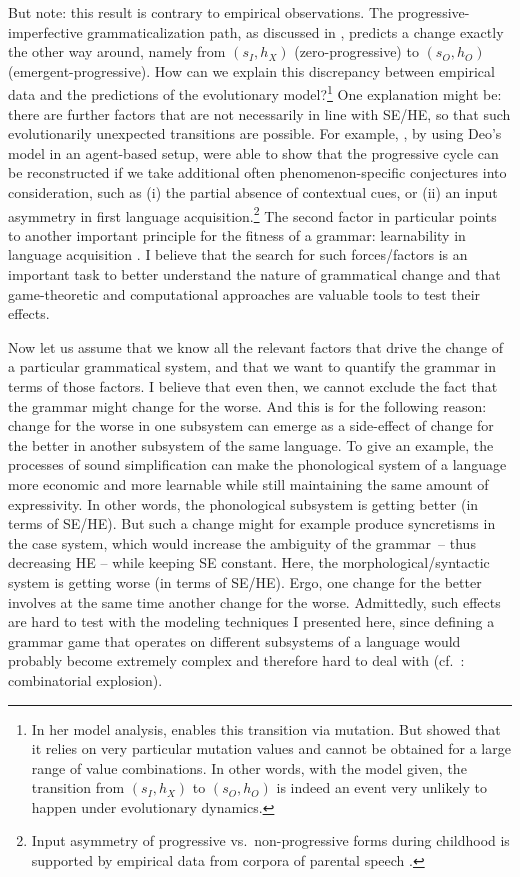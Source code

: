 \documentclass[output=paper,hidelinks]{langscibook}
\begin{document}
But note: this result is contrary to empirical observations. The progressive-imperfective grammaticalization path, as discussed in , predicts a change exactly the other way around, namely from $(s_I,h_X)$ (zero-progressive) to $(s_O,h_O)$ (emergent-progressive). How can we explain this discrepancy between empirical data and the predictions of the evolutionary model?\footnote{In her model analysis, \citet{Deo_2015} enables this transition via mutation. But \citet{yanovich_2015} showed that it relies on very particular mutation values and cannot be obtained for a large range of value combinations. In other words, with the model given, the transition from $(s_I,h_X)$ to $(s_O,h_O)$ is indeed an event very unlikely to happen under evolutionary dynamics.} 
One explanation might be: there are further factors that are not necessarily in line with SE/HE, so that such evolutionarily unexpected transitions are possible. For example, \citet{muehlenberndEnke_2017}, by using Deo's model in an agent-based setup, were able to show that the progressive cycle can be reconstructed if we take additional often phenomenon-specific conjectures into consideration, such as (i) the partial absence of contextual cues, or (ii) an input asymmetry in first language acquisition.\footnote{Input asymmetry of progressive vs.~non-progressive forms during childhood is supported by empirical data from corpora of parental speech \citep[cf.][]{Li_2001}.} The second factor in particular points to another important principle for the fitness of a grammar: learnability in language acquisition \citep[cf.][]{Niyogi_97,Yang_2002}.
I believe that the search for such forces/factors is an important task to better understand the nature of grammatical change and that game-theoretic and computational approaches are valuable tools to test their effects.\largerpage

Now let us assume that we know all the relevant factors that drive the change of a particular grammatical system, and that we want to quantify the grammar in terms of those factors. I believe that even then, we cannot exclude the fact that the grammar might change for the worse. And this is for the following reason: change for the worse in one subsystem can emerge as a side-effect of change for the better in another subsystem of the same language. To give an example, the processes of sound simplification can make the phonological system of a language more economic and more learnable while still maintaining the same amount of expressivity. In other words, the phonological subsystem is getting better (in terms of SE/HE). But such a change might for example produce syncretisms in the case system, which would increase the ambiguity of the grammar~-- thus decreasing HE -- while keeping SE constant. Here, the morphological/syntactic system is getting worse (in terms of SE/HE). Ergo, one change for the better involves at the same time another change for the worse. Admittedly, such effects are hard to test with the modeling techniques I presented here, since defining a grammar game that operates on different subsystems of a language would probably become extremely complex and therefore hard to deal with (cf.~: combinatorial explosion).
\end{document}
